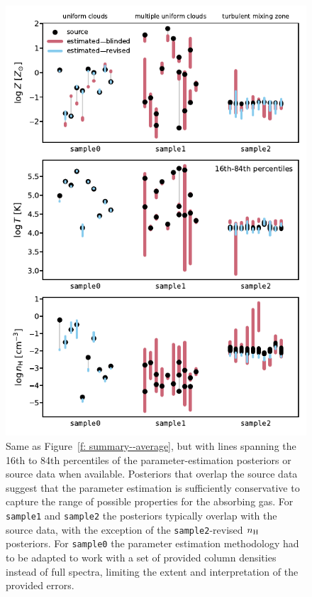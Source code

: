\documentclass[fleqn,usenatbib]{mnras}
\begin{document}
\begin{figure}
    \centering
    \includegraphics[width=\columnwidth]{figures/percentiles.pdf}
    \caption{
    Same as Figure~\ref{f: summary--average},
    but with lines spanning the 16th to 84th percentiles of the parameter-estimation posteriors or source data when available.
    Posteriors that overlap the source data suggest that the parameter estimation is sufficiently conservative to capture the range of possible properties for the absorbing gas.
    For \texttt{sample1} and \texttt{sample2} the posteriors typically overlap with the source data,
    with the exception of the \texttt{sample2}-revised $n_{\rm H}$ posteriors.
    For \texttt{sample0} the parameter estimation methodology had to be adapted to work with a set of provided column densities instead of full spectra,
    limiting the extent and interpretation of the provided errors.
    }
    \label{f: summary--widths}
\end{figure}
\end{document}
